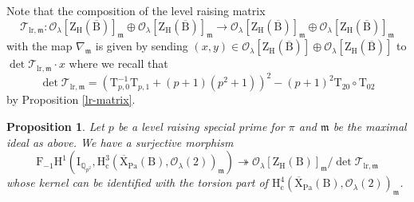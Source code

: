 \documentclass[10pt]{amsart}
\numberwithin{equation}{section}
\newtheorem{proposition}[equation]{Proposition}
\theoremstyle{definition}
\def\lr{\mathrm{lr}}
\def\Pa{\mathrm{Pa}}
\def\calO{\mathcal{O}}
\def\calT{\mathcal{T}}
\def\fracm{\mathfrak{m}}
\def\QQ{\mathbb{Q}}
\def\rmc{\mathrm{c}}
\def\rmB{\mathrm{B}}
\def\rmH{\mathrm{H}}
\def\rmX{\mathrm{X}}
\def\rmT{\mathrm{T}}
\def\rmZ{\mathrm{Z}}
\begin{document}
Note that the composition of the level raising matrix
\begin{equation*}
\calT_{\lr, \fracm}: \calO_{\lambda}[\rmZ_{\rmH}(\overline{\rmB})]_{\fracm}\oplus \calO_{\lambda}[\rmZ_{\rmH}(\overline{\rmB})]_{\fracm}\rightarrow \calO_{\lambda}[\rmZ_{\rmH}(\overline{\rmB})]_{\fracm}\oplus \calO_{\lambda}[\rmZ_{\rmH}(\overline{\rmB})]_{\fracm}
\end{equation*}
with the map $\nabla_{\fracm}$ is given by sending  $(x, y)\in \calO_{\lambda}[\rmZ_{\rmH}(\overline{\rmB})]\oplus \calO_{\lambda}[\rmZ_{\rmH}(\overline{\rmB})]$ to $\det \calT_{\lr,\fracm}\cdot x$ where we recall that
\begin{equation*}
\det\calT_{\lr, \fracm}= (\rmT^{-1}_{p,0}\rmT_{p,1}+(p+1)(p^{2}+1))^{2}-(p+1)^{2}\rmT_{20}\circ\rmT_{02} 
\end{equation*}
by Proposition \ref{lr-matrix}.

\begin{proposition}\label{surj}
Let $p$ be a level raising special prime for $\pi$ and $\fracm$ be the maximal ideal as above. We have a surjective morphism
\begin{equation*}
\mathrm{F}_{-1}\mathrm{H}^{1}(\mathrm{I}_{\QQ_{p^{2}}}, \mathrm{H}^{3}_{\rmc}(\overline{\rmX}_{\Pa}(\rmB), \calO_{\lambda}(2))_{\fracm})\twoheadrightarrow 
\calO_{\lambda}[\rmZ_{\rmH}(\rmB)]_{\fracm}/\det\calT_{\lr, \fracm}
\end{equation*}
whose kernel can be identified with the torsion part of $\rmH^{4}_{\rmc}(\overline{\rmX}_{\Pa}(\rmB), \calO_{\lambda}(2))_{\fracm}$.
\end{proposition}
\end{document}
